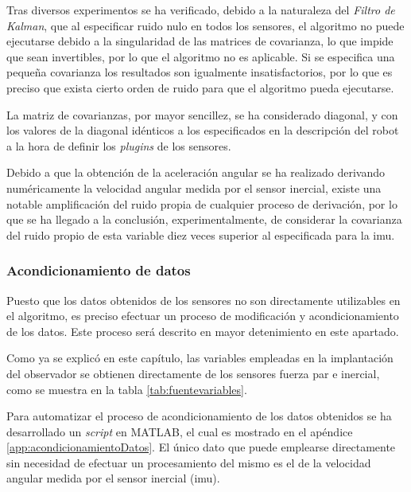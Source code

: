 Tras diversos experimentos se ha verificado, debido a la naturaleza del \emph{Filtro de Kalman}, que al especificar ruido nulo en todos los sensores, el algoritmo no puede ejecutarse debido a la singularidad de las matrices de covarianza, lo que impide que sean invertibles, por lo que el algoritmo no es aplicable. Si se especifica una pequeña covarianza los resultados son igualmente insatisfactorios, por lo que es preciso que exista cierto orden de ruido para que el algoritmo pueda ejecutarse. \par 

La matriz de covarianzas, por mayor sencillez, se ha considerado diagonal, y con los valores de la diagonal idénticos a los especificados en la descripción del robot a la hora de definir los \emph{plugins} de los sensores. \par 

Debido a que la obtención de la aceleración angular se ha realizado derivando numéricamente la velocidad angular medida por el sensor inercial, existe una notable amplificación del ruido propia de cualquier proceso de derivación, por lo que se ha llegado a la conclusión, experimentalmente, de considerar la covarianza del ruido propio de esta variable diez veces superior al especificada para la \acrshort{imu}. \par 

\subsubsection{Acondicionamiento de datos}

Puesto que los datos obtenidos de los sensores no son directamente utilizables en el algoritmo, es preciso efectuar un proceso de modificación y acondicionamiento de los datos. Este proceso será descrito en mayor detenimiento en este apartado. \par

Como ya se explicó en este capítulo, las variables empleadas en la implantación del observador se obtienen directamente de los sensores fuerza par e inercial, como se muestra en la tabla \ref{tab:fuentevariables}. \par  

Para automatizar el proceso de acondicionamiento de los datos obtenidos se ha desarrollado un \emph{script} en MATLAB, el cual es mostrado en el apéndice \ref{app:acondicionamientoDatos}. El único dato que puede emplearse directamente sin necesidad de efectuar un procesamiento del mismo es el de la velocidad angular medida por el sensor inercial (\acrshort{imu}). \par 

